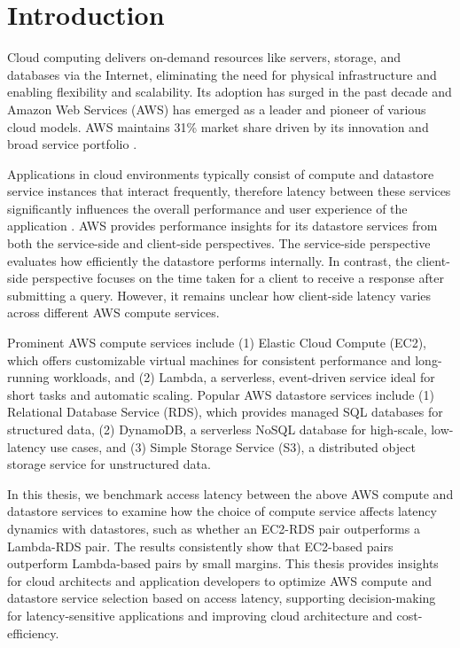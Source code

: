 \section{Introduction}
\label{cha:intro}

Cloud computing delivers on-demand resources like servers, storage, and databases via the Internet, eliminating the need for physical infrastructure and enabling flexibility and scalability. Its adoption has surged in the past decade and Amazon Web Services (AWS) has emerged as a leader and pioneer of various cloud models. AWS maintains 31\% market share driven by its innovation and broad service portfolio \cite{web_richter_cloud_market}.

Applications in cloud environments typically consist of compute and datastore service instances that interact frequently, therefore latency between these services significantly influences the overall performance and user experience of the application \cite{atricle_dean_tail,book_popescu_netlat}. AWS provides performance insights for its datastore services from both the service-side and client-side perspectives. The service-side perspective evaluates how efficiently the datastore performs internally. In contrast, the client-side perspective focuses on the time taken for a client to receive a response after submitting a query. However, it remains unclear how client-side latency varies across different AWS compute services.

Prominent AWS compute services include (1) Elastic Cloud Compute (EC2), which offers customizable virtual machines for consistent performance and long-running workloads, and (2) Lambda, a serverless, event-driven service ideal for short tasks and automatic scaling. Popular AWS datastore services include (1) Relational Database Service (RDS), which provides managed SQL databases for structured data, (2) DynamoDB, a serverless NoSQL database for high-scale, low-latency use cases, and (3) Simple Storage Service (S3), a distributed object storage service for unstructured data.

In this thesis, we benchmark access latency between the above AWS compute and datastore services to examine how the choice of compute service affects latency dynamics with datastores, such as whether an EC2-RDS pair outperforms a Lambda-RDS pair. The results consistently show that EC2-based pairs outperform Lambda-based pairs by small margins. This thesis provides insights for cloud architects and application developers to optimize AWS compute and datastore service selection based on access latency, supporting decision-making for latency-sensitive applications and improving cloud architecture and cost-efficiency.

